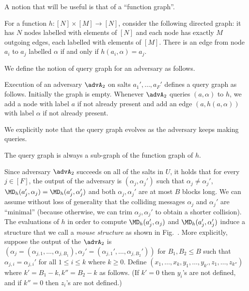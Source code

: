 A notion that will be useful is that of a ``function graph''. 
\begin{definition}
For a function $h:[N]\times [M]\to [N]$, consider the following directed graph: it has $N$ nodes labelled with elements of $[N]$ and each node has exactly $M$ outgoing edges, each labelled with elements of $[M]$. There is an edge from node $a_i$ to $a_j$ labelled $\alpha$ if and only if $h(a_i,\alpha)=a_j$.
\end{definition}
\noindent We define the notion of query graph for an adversary as follows.
\begin{definition}
Execution of an adversary $\advA_2$ on salts $a_1',\ldots,a_F'$ defines a query graph as follows. Initially the graph is empty. Whenever  $\advA_2$ queries $(a,\alpha)$ to $h$, we add a node with label $a$ if not already present and add an edge $(a,h(a,\alpha))$ with label $\alpha$ if not already present.
\end{definition}
We explicitly note that the query graph evolves as the adversary keeps making queries. 
\begin{fact}
The query graph is always a sub-graph of the function graph of $h$.
\end{fact}
Since adversary $\advA_2$ succeeds on all of the salts in $U$, it holds that for every $j\in [F]$, the output of the adversary is $(\alpha_j,\alpha_j')$ 
such that $\alpha_j\neq \alpha_j'$, $\MD_h(a_j',\alpha_j)=\MD_h(a_j',\alpha_j')$ and both $\alpha_j,\alpha_j'$ are at most $B$ blocks long.
We can assume without loss of generality that the colliding messages $\alpha_j$ and $\alpha_j'$ are ``minimal'' (because otherwise, we can trim $\alpha_j,\alpha_j'$ to obtain a shorter collision).
The evaluations of $h$ in order to compute $\MD_h(a_j',\alpha_j)$ and $\MD_h(a_j',\alpha_j')$ induce a structure that we call a \emph{mouse structure} as shown in Fig.~.
More explicitly, suppose the output of the $\advA_2$ is $(\alpha_j=(\alpha_{j,1},\ldots,\alpha_{j,B_1}),\alpha_j'=(\alpha_{j,1}',\ldots,\alpha_{j,B_2}'))$ for $B_1,B_2\leq B$ such that $\alpha_{j,i}=\alpha_{j,i}'$ for all $1 \leq i\leq k$ where $k\geq 0$. 
Define $(x_1,\ldots,x_k,y_1,\ldots,y_{k'},z_1,\ldots,z_{k''})$ where $k'=B_1-k,k''=B_2-k$ as follows. (If $k'=0$ then $y_i$'s are not defined, and if $k''=0$ then $z_i$'s are not defined.)
